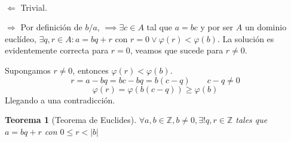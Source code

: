 \documentclass[11pt, a4paper, titlepage]{article}
\makeatletter
\renewenvironment{proof}[1][\proofname] {\vspace{-15pt}\par\pushQED{\qed}\normalfont\topsep6\p@\@plus6\p@\relax\trivlist\item[\hskip\labelsep\it#1\@addpunct{.}]\ignorespaces}{\popQED\endtrivlist\@endpefalse}
\providecommand{\ent}{\mathbb{Z}}
\theoremstyle{theorem-style}
\newtheorem*{nth}{Teorema}
\theoremstyle{definition-style}
\theoremstyle{remark-style}
\theoremstyle{example-style}
\makeatother
\begin{document}
\begin{proof}\hfill\\

    $\boxed{\Longleftarrow}$ Trivial.
    
  $\boxed{\Longrightarrow}$ Por definición de $b/a$, $\implies \exists c \in A$ tal que $a=bc$ y por ser $A$ un dominio euclídeo, $\exists q,r \in A : a = bq + r $
  con $r=0 \vee \varphi(r) < \varphi(b)$. La solución 	es evidentemente correcta para $r = 0$, veamos que sucede para $r \neq 	0$.
    
    Supongamos $r \neq 0$, entonces $\varphi(r) < \varphi(b)$. 
    $$r = a - bq = bc - bq = b(c-q) \quad \quad c-q \neq 0$$
    $$\varphi(r) = \varphi(b(c-q)) \ge \varphi(b)$$
    Llegando a una contradicción.

\end{proof}

\begin{nth}[Teorema de Euclides]

	$\forall a,b \in \ent, b \neq 0, \exists !q,r \in \ent$ tales que $a = bq + r $ con $0 \le r < |b|$
\end{nth}
\end{document}
